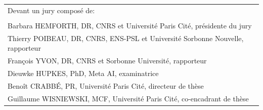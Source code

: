 \documentclass[12pt,oneside]{book} %
\begin{document}
\begin{titlepage}
		\begin{center}
        \begin{tabular}{l}
        {\fontsize{14}{14}\selectfont Devant un jury composé de: }\\
        \\
        Barbara \textsc{HEMFORTH}, \textsc{DR}, CNRS et Université Paris Cité, présidente du jury \\
        Thierry \textsc{POIBEAU}, \textsc{DR}, CNRS, ENS-PSL et Université Sorbonne Nouvelle, rapporteur \\
        François \textsc{YVON}, \textsc{DR}, CNRS et Sorbonne Université, rapporteur \\
        Dieuwke \textsc{HUPKES}, PhD, Meta AI, examinatrice  \\
        Benoît \textsc{CRABBÉ}, \textsc{PR}, Université Paris Cité, directeur de thèse \\
        Guillaume \textsc{WISNIEWSKI}, \textsc{MCF}, Université Paris Cité, co-encadrant de thèse
        \end{tabular}
         \end{center}
	\newpage
	\end{titlepage}
\pagestyle{fancy}

\fancyhead{}

\renewcommand{\chaptermark}[1]{\markboth{\textsc{#1}}{}}


\frontmatter


        
\clearpage %





\tableofcontents
\clearpage
\listoffigures
{}

\clearpage
\listoftables
{}


\mainmatter

\setlength{\parskip}{.7em}

\titlespacing*{\section}{0pt}{.9em}{.8em}
\renewcommand{\baselinestretch}{1.1}
\end{document}
